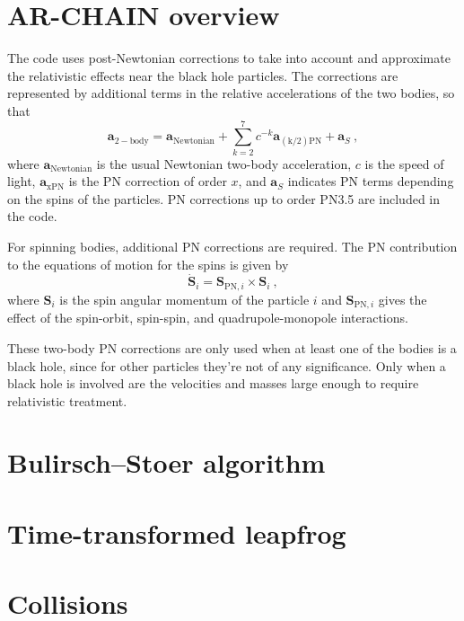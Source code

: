 \documentclass[english, oneside]{HYgradu}
\begin{document}
\section{AR-CHAIN overview}

The code uses post-Newtonian corrections to take into account and approximate the relativistic effects near the black hole particles. The corrections are represented by additional terms in the relative accelerations of the two bodies, so that
\begin{equation}
\boldsymbol{a}_\mathrm{2-body} = \boldsymbol{a}_\mathrm{Newtonian} + \sum_{k=2}^7 c^{-k} \boldsymbol{a}_\mathrm{(k/2)PN} + \boldsymbol{a}_S \ ,
\end{equation}
where $\boldsymbol{a}_\mathrm{Newtonian}$ is the usual Newtonian two-body acceleration, $c$ is the speed of light, $\boldsymbol{a}_\mathrm{xPN}$ is the PN correction of order $x$, and $\boldsymbol{a}_S$ indicates PN terms depending on the spins of the particles. PN corrections up to order PN3.5 are included in the code.

For spinning bodies, additional PN corrections are required. The PN contribution to the equations of motion for the spins is given by
\begin{equation}
\boldsymbol{\dot{S}}_i = \boldsymbol{S}_{\mathrm{PN},i} \times \boldsymbol{S}_i \ ,
\end{equation}
where $\boldsymbol{S}_i$ is the spin angular momentum of the particle $i$ and $\boldsymbol{S}_{\mathrm{PN},i}$ gives the effect of the spin-orbit, spin-spin, and quadrupole-monopole interactions. %

These two-body PN corrections are only used when at least one of the bodies is a black hole, since for other particles they're not of any significance. Only when a black hole is involved are the velocities and masses large enough to require relativistic treatment.

\section{Bulirsch–Stoer algorithm}
\section{Time-transformed leapfrog}
\section{Collisions}
\end{document}

